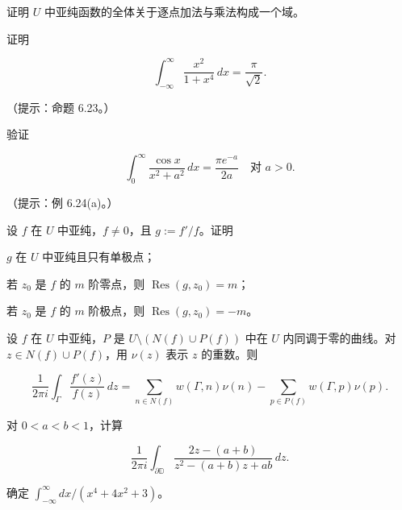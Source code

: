 \begin{exercises}
证明 $ U $ 中亚纯函数的全体关于逐点加法与乘法构成一个域。

\item

证明

\[
\int_{-\infty}^{\infty}\frac{x^{2}}{1 + x^{4}}\,dx = \frac{\pi}{\sqrt{2}} .
\]

（提示：命题 6.23。）

\item

验证

\[
\int_{0}^{\infty}\frac{\cos x}{x^{2} + a^{2}}\,dx = \frac{\pi e^{-a}}{2a} \quad \text{对 } a > 0 .
\]

（提示：例 6.24(a)。）

\item

设 $ f $ 在 $ U $ 中亚纯，$ f \ne 0 $，且 $ g := f'/f $。证明

\begin{subitems}
\item

$ g $ 在 $ U $ 中亚纯且只有单极点；

\item

若 $ z_{0} $ 是 $ f $ 的 $ m $ 阶零点，则 $ \operatorname{Res}(g,z_{0}) = m $；

\item

若 $ z_{0} $ 是 $ f $ 的 $ m $ 阶极点，则 $ \operatorname{Res}(g,z_{0}) = -m $。

\end{subitems}

\item

设 $ f $ 在 $ U $ 中亚纯，$ P $ 是 $ U\setminus\left(N(f) \cup P(f)\right) $ 中在 $ U $ 内同调于零的曲线。对 $ z \in N(f) \cup P(f) $，用 $ \nu(z) $ 表示 $ z $ 的重数。则

\[
\frac{1}{2\pi i}\int_{\Gamma}\frac{f'(z)}{f(z)}\,dz = \sum_{n\in N(f)}w(\Gamma,n)\nu(n) - \sum_{p\in P(f)}w(\Gamma,p)\nu(p) .
\]
\item

对 $ 0 < a < b < 1 $，计算

\[
\frac{1}{2\pi i}\int_{\partial\mathbb{D}}\frac{2z - (a + b)}{z^{2} - (a + b)z + ab}\,dz .
\]
\item

确定 $ \int_{-\infty}^{\infty}dx/(x^{4} + 4x^{2} + 3) $。

\end{exercises}
